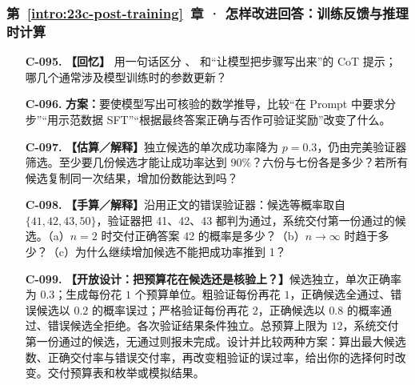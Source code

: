 \subsubsection*{第~\ref*{intro:23c-post-training}~章 · 怎样改进回答：训练反馈与推理时计算}
\begin{enumerate}[label={},leftmargin=4.8em,itemsep=4pt]
\item[\textbf{C-095.}] \leavevmode{}\label{exercise:C-095}\label{exercise:reference-policy-role}\label{exercise:linked-23c-post-training}  \textbf{【回忆】} 用一句话区分 、 和“让模型把步骤写出来”的 CoT 提示；
哪几个通常涉及模型训练时的参数更新？
\item[\textbf{C-096.}] \leavevmode{}\label{exercise:C-096}\label{exercise:reasoning-interventions}\textbf{方案：}要使模型写出可核验的数学推导，比较“在 Prompt 中要求分步”“用示范数据 SFT”“根据最终答案正确与否作可验证奖励”改变了什么。
\item[\textbf{C-097.}] \leavevmode{}\label{exercise:C-097}\label{exercise:candidate-success-budget}\textbf{【估算／解释】}独立候选的单次成功率降为 $p=0.3$，仍由完美验证器筛选。至少要几份候选才能让成功率达到 $90\%$？六份与七份各是多少？若所有候选复制同一次结果，增加份数能达到吗？
\item[\textbf{C-098.}] \leavevmode{}\label{exercise:C-098}\label{exercise:faulty-verifier-limit}\textbf{【手算／解释】}沿用正文的错误验证器：候选等概率取自 $\{41,42,43,50\}$，验证器把 41、42、43 都判为通过，系统交付第一份通过的候选。（a）$n=2$ 时交付正确答案 42 的概率是多少？（b）$n\to\infty$ 时趋于多少？（c）为什么继续增加候选不能把成功率推到 1？
\item[\textbf{C-099.}] \leavevmode{}\label{exercise:C-099}\label{exercise:verifier-budget-design}\textbf{【开放设计：把预算花在候选还是核验上？】}候选独立，单次正确率为 $0.3$；生成每份花 $1$ 个预算单位。粗验证每份再花 $1$，正确候选全通过、错误候选以 $0.2$ 的概率误过；严格验证每份再花 $2$，正确候选以 $0.8$ 的概率通过、错误候选全拒绝。各次验证结果条件独立。总预算上限为 $12$，系统交付第一份通过的候选，无通过则报未完成。设计并比较两种方案：算出最大候选数、正确交付率与错误交付率，再改变粗验证的误过率，给出你的选择何时改变。交付预算表和枚举或模拟结果。

\end{enumerate}
